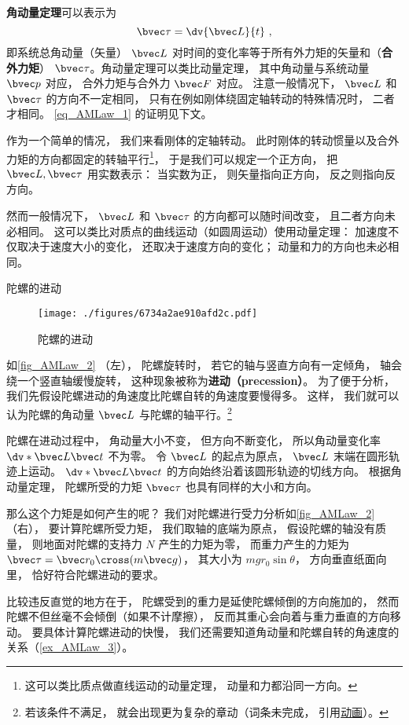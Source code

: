 
\textbf{角动量定理}可以表示为
\begin{equation}\label{eq_AMLaw_1}
\bvec \tau = \dv{\bvec L}{t}~,
\end{equation}
即系统总角动量（矢量） $\bvec L$ 对时间的变化率等于所有外力矩的矢量和（\textbf{合外力矩}） $\bvec \tau$。角动量定理可以类比动量定理， 其中角动量与系统动量 $\bvec p$ 对应， 合外力矩与合外力 $\bvec F$ 对应。 注意一般情况下， $\bvec L$ 和 $\bvec \tau$ 的方向不一定相同， 只有在例如刚体绕固定轴转动的特殊情况时， 二者才相同。 \autoref{eq_AMLaw_1} 的证明见下文。

作为一个简单的情况， 我们来看刚体的定轴转动。 此时刚体的转动惯量以及合外力矩的方向都固定的转轴平行\footnote{这可以类比质点做直线运动的动量定理， 动量和力都沿同一方向。}， 于是我们可以规定一个正方向， 把 $\bvec L, \bvec \tau$ 用实数表示： 当实数为正， 则矢量指向正方向， 反之则指向反方向。

然而一般情况下， $\bvec L$ 和 $\bvec \tau$ 的方向都可以随时间改变， 且二者方向未必相同。 这可以类比对质点的曲线运动（如圆周运动）使用动量定理： 加速度不仅取决于速度大小的变化， 还取决于速度方向的变化； 动量和力的方向也未必相同。
\begin{example}{陀螺的进动}\label{ex_AMLaw_2}
\begin{figure}[ht]
\centering
\texttt{[image: ./figures/6734a2ae910afd2c.pdf]}
\caption{陀螺的进动}\label{fig_AMLaw_2}
\end{figure}

如\autoref{fig_AMLaw_2} （左）， 陀螺旋转时， 若它的轴与竖直方向有一定倾角， 轴会绕一个竖直轴缓慢旋转， 这种现象被称为\textbf{进动（precession）}。 为了便于分析， 我们先假设陀螺进动的角速度比陀螺自转的角速度要慢得多。 这样， 我们就可以认为陀螺的角动量 $\bvec L$ 与陀螺的轴平行。\footnote{若该条件不满足， 就会出现更为复杂的章动（词条未完成， 引用\href{https://wuli.wiki/apps/Top.html}{动画}）。}

陀螺在进动过程中， 角动量大小不变， 但方向不断变化， 所以角动量变化率 $\dv*{\bvec L}{\bvec t}$ 不为零。 令 $\bvec L$ 的起点为原点， $\bvec L$ 末端在圆形轨迹上运动。 $\dv*{\bvec L}{\bvec t}$ 的方向始终沿着该圆形轨迹的切线方向。 根据角动量定理， 陀螺所受的力矩 $\bvec \tau$ 也具有同样的大小和方向。

那么这个力矩是如何产生的呢？ 我们对陀螺进行受力分析如\autoref{fig_AMLaw_2} （右）， 要计算陀螺所受力矩， 我们取轴的底端为原点， 假设陀螺的轴没有质量， 则地面对陀螺的支持力 $N$ 产生的力矩为零， 而重力产生的力矩为 $\bvec \tau = \bvec r_0 \cross (m\bvec g)$， 其大小为 $mgr_0\sin\theta$， 方向垂直纸面向里， 恰好符合陀螺进动的要求。

比较违反直觉的地方在于， 陀螺受到的重力是延使陀螺倾倒的方向施加的， 然而陀螺不但丝毫不会倾倒（如果不计摩擦）， 反而其重心会向着与重力垂直的方向移动。 要具体计算陀螺进动的快慢， 我们还需要知道角动量和陀螺自转的角速度的关系（\autoref{ex_AMLaw_3}）。
\end{example}

